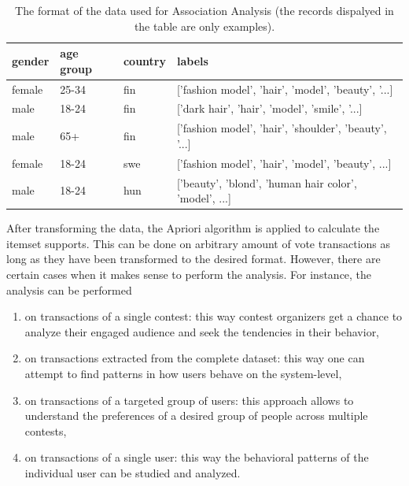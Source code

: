     \begin{table}[]
        \centering
        \begin{adjustbox}{width=1\textwidth}
            \begin{tabular}{l|l|l|l}
                gender & age group & country & labels \\
                \hline
                female & 25-34 & fin & ['fashion model', 'hair', 'model', 'beauty', '...] \\
                male & 18-24 & fin & ['dark hair', 'hair', 'model', 'smile', '...] \\
                male & 65+ & fin & ['fashion model', 'hair', 'shoulder', 'beauty', '...] \\
                female & 18-24 & swe & ['fashion model', 'hair', 'model', 'beauty', ...] \\
                male & 18-24 & hun & ['beauty', 'blond', 'human hair color', 'model', ...]
            \end{tabular}
        \end{adjustbox}
        \caption{The format of the data used for Association Analysis (the records dispalyed in the table are only examples).}
        \label{association_analyisis_data}
    \end{table}

    After transforming the data, the Apriori algorithm is applied to calculate the itemset supports. This can be done on arbitrary amount of vote transactions as long as they have been transformed to the desired format. However, there are certain cases when it makes sense to perform the analysis. For instance, the analysis can be performed 

    \begin{enumerate}
        \item on transactions of a single contest: this way contest organizers get a chance to analyze their engaged audience and seek the tendencies in their behavior,
        \item on transactions extracted from the complete dataset: this way one can attempt to find patterns in how users behave on the system-level,
        \item on transactions of a targeted group of users: this approach allows to understand the preferences of a desired group of people across multiple contests,
        \item on transactions of a single user: this way the behavioral patterns of the individual user can be studied and analyzed. 
    \end{enumerate}

